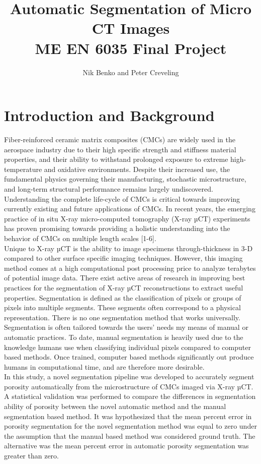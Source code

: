 \documentclass[12pt]{article}
\begin{document}
\title{ Automatic Segmentation of Micro CT Images  \\ \normalsize{ME EN 6035 Final Project}}
\author{Nik Benko and Peter Creveling}
\maketitle


\begin{abstract} 

\end{abstract}

\section{Introduction and Background}

Fiber-reinforced ceramic matrix composites (CMCs) are widely used in the aerospace industry due to their high specific strength and stiffness material properties, and their ability to withstand prolonged exposure to extreme high-temperature and oxidative environments. Despite their increased use, the fundamental physics governing their manufacturing, stochastic microstructure, and long-term structural performance remains largely undiscovered. Understanding the complete life-cycle of CMCs is critical towards improving currently existing and future applications of CMCs. In recent years, the emerging practice of in situ X-ray micro-computed tomography (X-ray µCT) experiments has proven promising towards providing a holistic understanding into the behavior of CMCs on multiple length scales [1-6].\\
Unique to X-ray µCT is the ability to image specimens through-thickness in 3-D compared to other surface specific imaging techniques. However, this imaging method comes at a high computational post processing price to analyze terabytes of potential image data. There exist active areas of research in improving best practices for the segmentation of X-ray µCT reconstructions to extract useful properties. Segmentation is defined as the classification of pixels or groups of pixels into multiple segments. These segments often correspond to a physical representation. There is no one segmentation method that works universally. Segmentation is often tailored towards the users’ needs my means of manual or automatic practices. To date, manual segmentation is heavily used due to the knowledge humans use when classifying individual pixels compared to computer based methods. Once trained, computer based methods significantly out produce humans in computational time, and are therefore more desirable.\\
In this study, a novel segmentation pipeline was developed to accurately segment porosity automatically from the microstructure of CMCs imaged via X-ray µCT. A statistical validation was performed to compare the differences in segmentation ability of porosity between the novel automatic method and the manual segmentation based method. It was hypothesized that the mean percent error in porosity segmentation for the novel segmentation method was equal to zero under the assumption that the manual based method was considered ground truth. The alternative was the mean percent error in automatic porosity segmentation was greater than zero.
\end{document}
